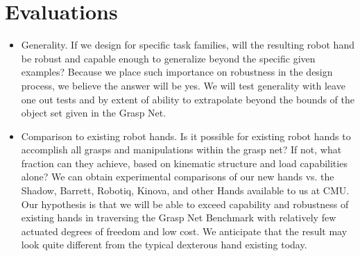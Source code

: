 \section{Evaluations}

\begin{itemize}

  \item Generality.   If we design for specific task families, will the resulting robot hand be robust and capable enough to generalize beyond the specific given examples?   Because we place such importance on robustness in the design process, we believe the answer will be yes.   We will test generality with leave one out tests and by extent of ability to extrapolate beyond the bounds of the object set given in the Grasp Net.

  \item Comparison to existing robot hands.    Is it possible for existing robot hands to accomplish all grasps and manipulations within the grasp net?   If not, what fraction can they achieve, based on kinematic structure and load capabilities alone?    We can obtain experimental comparisons of our new hands vs. the Shadow, Barrett, Robotiq, Kinova, and other Hands available to us at CMU.   Our hypothesis is that we will be able to exceed capability and robustness of existing hands in traversing the Grasp Net Benchmark with relatively few actuated degrees of freedom and low cost.   We anticipate that the result may look quite different from the typical dexterous hand existing today.

\end{itemize}
